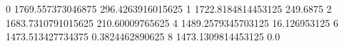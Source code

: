 0 1769.557373046875 296.4263916015625
1 1722.8184814453125 249.6875
2 1683.7310791015625 210.60009765625
4 1489.2579345703125 16.126953125
6 1473.513427734375 0.3824462890625
8 1473.1309814453125 0.0
